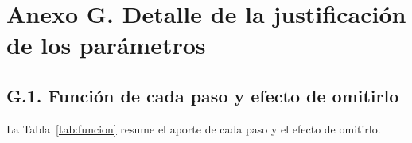 
\section*{Anexo G. Detalle de la justificación de los parámetros}
\label{sec:anexo-parametros}

\setcounter{figure}{0}
\setcounter{table}{0}

\subsection*{G.1. Función de cada paso y efecto de omitirlo}


La Tabla~\ref{tab:funcion} resume el aporte de cada paso y el efecto de omitirlo.

